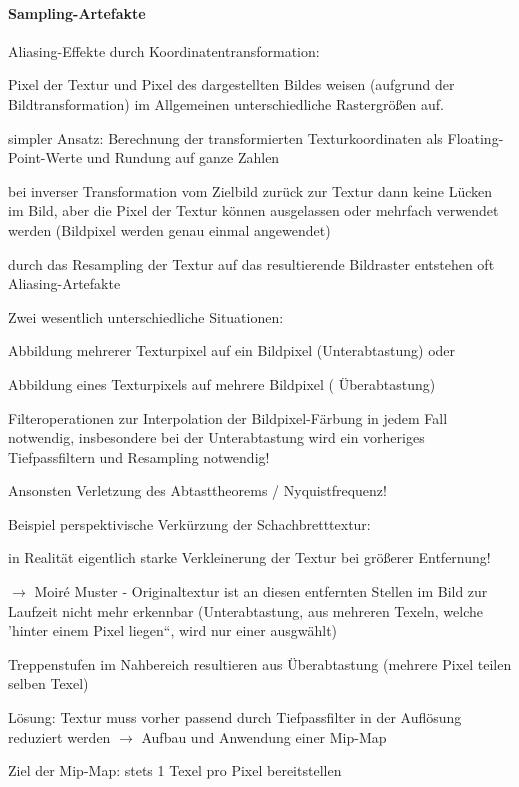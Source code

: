 \documentclass[landscape]{article}
\begin{document}
\begin{multicols}{3}
  \paragraph{Sampling-Artefakte}
  Aliasing-Effekte durch Koordinatentransformation:
  \begin{itemize*}
    \item Pixel der Textur und Pixel des dargestellten Bildes weisen (aufgrund der Bildtransformation) im Allgemeinen unterschiedliche Rastergrößen auf.
    \item simpler Ansatz: Berechnung der transformierten Texturkoordinaten als Floating-Point-Werte und Rundung auf ganze Zahlen
    \item bei inverser Transformation vom Zielbild zurück zur Textur dann keine Lücken im Bild, aber die Pixel der Textur können ausgelassen oder mehrfach verwendet werden (Bildpixel werden genau einmal angewendet)
    \item durch das Resampling der Textur auf das resultierende Bildraster entstehen oft Aliasing-Artefakte
  \end{itemize*}
  
  Zwei wesentlich unterschiedliche Situationen:
  \begin{itemize*}
    \item Abbildung mehrerer Texturpixel auf ein Bildpixel (Unterabtastung) oder
    \item Abbildung eines Texturpixels auf mehrere Bildpixel ( Überabtastung)
    \item Filteroperationen zur Interpolation der Bildpixel-Färbung in jedem Fall notwendig, insbesondere bei der Unterabtastung wird ein vorheriges Tiefpassfiltern und Resampling notwendig!
    \item Ansonsten Verletzung des Abtasttheorems / Nyquistfrequenz!
  \end{itemize*}
  
  Beispiel perspektivische Verkürzung der Schachbretttextur:
  \begin{itemize*}
    \item in Realität eigentlich starke Verkleinerung der Textur bei größerer Entfernung!
    \item $\rightarrow$ Moiré Muster - Originaltextur ist an diesen entfernten Stellen im Bild zur Laufzeit nicht mehr erkennbar (Unterabtastung, aus mehreren Texeln, welche 'hinter einem Pixel liegen“, wird nur einer ausgwählt)
    \item Treppenstufen im Nahbereich resultieren aus Überabtastung (mehrere Pixel teilen selben Texel)
    \item Lösung: Textur muss vorher passend durch Tiefpassfilter in der Auflösung reduziert werden $\rightarrow$ Aufbau und Anwendung einer Mip-Map
    \item Ziel der Mip-Map: stets 1 Texel pro Pixel bereitstellen
  \end{itemize*}
  

\end{multicols}
\end{document}
